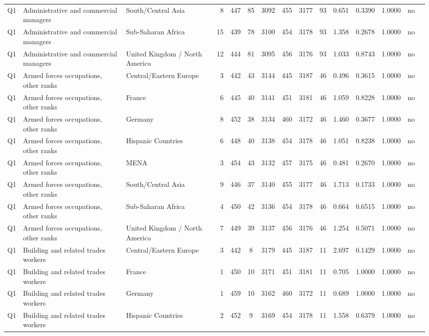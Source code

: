 \begin{longtable}{lllrcccccccccll}
Q1 & Administrative and commercial managers & South/Central Asia & 8 & 447 & 85 & 3092 & 455 & 3177 & 93 & 0.651 & 0.3390 & 1.0000 & no \\
Q1 & Administrative and commercial managers & Sub-Saharan Africa & 15 & 439 & 78 & 3100 & 454 & 3178 & 93 & 1.358 & 0.2678 & 1.0000 & no \\
Q1 & Administrative and commercial managers & United Kingdom / North America & 12 & 444 & 81 & 3095 & 456 & 3176 & 93 & 1.033 & 0.8743 & 1.0000 & no \\
Q1 & Armed forces occupations, other ranks & Central/Eastern Europe & 3 & 442 & 43 & 3144 & 445 & 3187 & 46 & 0.496 & 0.3615 & 1.0000 & no \\
Q1 & Armed forces occupations, other ranks & France & 6 & 445 & 40 & 3141 & 451 & 3181 & 46 & 1.059 & 0.8228 & 1.0000 & no \\
Q1 & Armed forces occupations, other ranks & Germany & 8 & 452 & 38 & 3134 & 460 & 3172 & 46 & 1.460 & 0.3677 & 1.0000 & no \\
Q1 & Armed forces occupations, other ranks & Hispanic Countries & 6 & 448 & 40 & 3138 & 454 & 3178 & 46 & 1.051 & 0.8238 & 1.0000 & no \\
Q1 & Armed forces occupations, other ranks & MENA & 3 & 454 & 43 & 3132 & 457 & 3175 & 46 & 0.481 & 0.2670 & 1.0000 & no \\
Q1 & Armed forces occupations, other ranks & South/Central Asia & 9 & 446 & 37 & 3140 & 455 & 3177 & 46 & 1.713 & 0.1733 & 1.0000 & no \\
Q1 & Armed forces occupations, other ranks & Sub-Saharan Africa & 4 & 450 & 42 & 3136 & 454 & 3178 & 46 & 0.664 & 0.6515 & 1.0000 & no \\
Q1 & Armed forces occupations, other ranks & United Kingdom / North America & 7 & 449 & 39 & 3137 & 456 & 3176 & 46 & 1.254 & 0.5071 & 1.0000 & no \\
Q1 & Building and related trades workers & Central/Eastern Europe & 3 & 442 & 8 & 3179 & 445 & 3187 & 11 & 2.697 & 0.1429 & 1.0000 & no \\
Q1 & Building and related trades workers & France & 1 & 450 & 10 & 3171 & 451 & 3181 & 11 & 0.705 & 1.0000 & 1.0000 & no \\
Q1 & Building and related trades workers & Germany & 1 & 459 & 10 & 3162 & 460 & 3172 & 11 & 0.689 & 1.0000 & 1.0000 & no \\
Q1 & Building and related trades workers & Hispanic Countries & 2 & 452 & 9 & 3169 & 454 & 3178 & 11 & 1.558 & 0.6379 & 1.0000 & no \\

\end{longtable}
